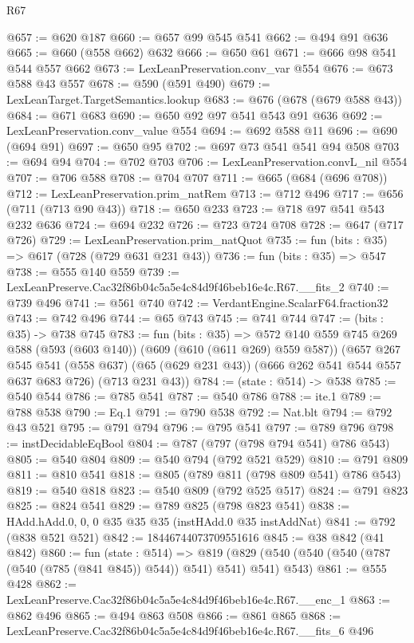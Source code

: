 \begin{lexlean}{R67}
\begin{coremodule}
@657 := @620 @187
@660 := @657 @99 @545 @541
@662 := @494 @91 @636
@665 := @660 (@558 @662) @632
@666 := @650 @61
@671 := @666 @98 @541 @544 @557 @662
@673 := LexLeanPreservation.conv_var @554
@676 := @673 @588 @43 @557
@678 := @590 (@591 @490)
@679 := LexLeanTarget.TargetSemantics.lookup
@683 := @676 (@678 (@679 @588 @43))
@684 := @671 @683
@690 := @650 @92 @97 @541 @543 @91 @636
@692 := LexLeanPreservation.conv_value @554
@694 := @692 @588 @11
@696 := @690 (@694 @91)
@697 := @650 @95
@702 := @697 @73 @541 @541 @94 @508
@703 := @694 @94
@704 := @702 @703
@706 := LexLeanPreservation.convL_nil @554
@707 := @706 @588
@708 := @704 @707
@711 := @665 (@684 (@696 @708))
@712 := LexLeanPreservation.prim_natRem
@713 := @712 @496
@717 := @656 (@711 (@713 @90 @43))
@718 := @650 @233
@723 := @718 @97 @541 @543 @232 @636
@724 := @694 @232
@726 := @723 @724 @708
@728 := @647 (@717 @726)
@729 := LexLeanPreservation.prim_natQuot
@735 := fun (bits : @35) => @617 (@728 (@729 @631 @231 @43))
@736 := fun (bits : @35) => @547
@738 := @555 @140 @559
@739 := LexLeanPreserve.Cac32f86b04c5a5e4c84d9f46beb16e4c.R67.__fits_2
@740 := @739 @496
@741 := @561 @740
@742 := VerdantEngine.ScalarF64.fraction32
@743 := @742 @496
@744 := @65 @743
@745 := @741 @744
@747 := (bits : @35) -> @738 @745
@783 := fun (bits : @35) =>
  @572
    @140
    @559
    @745
    @269
    @588
    (@593 (@603 @140))
    (@609 (@610 (@611 @269) @559 @587))
    (@657
      @267
      @545
      @541
      (@558 @637)
      (@65 (@629 @231 @43))
      (@666 @262 @541 @544 @557 @637 @683 @726)
      (@713 @231 @43))
@784 := (state : @514) -> @538
@785 := @540 @544
@786 := @785 @541
@787 := @540 @786
@788 := ite.{1}
@789 := @788 @538
@790 := Eq.{1}
@791 := @790 @538
@792 := Nat.blt
@794 := @792 @43 @521
@795 := @791 @794
@796 := @795 @541
@797 := @789 @796
@798 := instDecidableEqBool
@804 := @787 (@797 (@798 @794 @541) @786 @543)
@805 := @540 @804
@809 := @540 @794 (@792 @521 @529)
@810 := @791 @809
@811 := @810 @541
@818 := @805 (@789 @811 (@798 @809 @541) @786 @543)
@819 := @540 @818
@823 := @540 @809 (@792 @525 @517)
@824 := @791 @823
@825 := @824 @541
@829 := @789 @825 (@798 @823 @541)
@838 := HAdd.hAdd.{0, 0, 0} @35 @35 @35 (instHAdd.{0} @35 instAddNat)
@841 := @792 (@838 @521 @521)
@842 := 18446744073709551616
@845 := @38 @842 (@41 @842)
@860 := fun (state : @514) =>
  @819 (@829 (@540 (@540 (@540 (@787 (@540 (@785 (@841 @845)) @544)) @541) @541) @541) @543)
@861 := @555 @428
@862 := LexLeanPreserve.Cac32f86b04c5a5e4c84d9f46beb16e4c.R67.__enc_1
@863 := @862 @496
@865 := @494 @863 @508
@866 := @861 @865
@868 := LexLeanPreserve.Cac32f86b04c5a5e4c84d9f46beb16e4c.R67.__fits_6 @496

\end{coremodule}
\end{lexlean}
